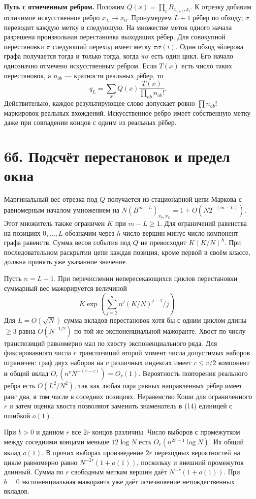 \documentclass[11pt,a4paper]{article}
\newcommand{\sect}[1]{\section*{\sffamily\color{ink}#1}}
\newcommand{\subt}[1]{\par\medskip\noindent\textbf{#1.}\quad}
\begin{document}
\subt{Путь с отмеченным ребром} Положим $Q(x)=\prod_i B_{x_{i+1},x_i}$. К отрезку добавим отличимое искусственное ребро $x_L\to x_0$. Пронумеруем $L+1$ рёбер по обходу; $\sigma$ переводит каждую метку в следующую. На множестве меток одного начала разрешена произвольная перестановка выходящих рёбер. Для совокупной перестановки $\pi$ следующий переход имеет метку $\pi\sigma(i)$. Один обход эйлерова графа получается тогда и только тогда, когда $\pi\sigma$ есть один цикл. Его начало однозначно отмечено искусственным ребром. Если $T(x)$ есть число таких перестановок, а $n_{ab}$ --- кратности реальных рёбер, то
\[
                       q_L=\sum_x Q(x)\frac{T(x)}{\prod_{ab} n_{ab}!}.       \tag{14}
\]
Действительно, каждое результирующее слово допускает ровно $\prod n_{ab}!$ маркировок реальных вхождений. Искусственное ребро имеет собственную метку даже при совпадении концов с одним из реальных рёбер.
\newpage
\sect{6б. Подсчёт перестановок и предел окна}
Маргинальный вес отрезка под $Q$ получается из стационарной цепи Маркова с равномерным началом умножением на $N(B^{m-L})_{x_0,x_L}=1+O(N2^{-(m-L)})$. Этот множитель также ограничен $K$ при $m-L\ge1$. Для ограничений равенства на позициях $0,\ldots,L$ обозначим через $h$ число вершин минус число компонент графа равенств. Сумма весов события под $Q$ не превосходит $K(K/N)^h$. При последовательном раскрытии цепи каждая позиция, кроме первой в своём классе, должна принять уже указанное значение.

Пусть $n=L+1$. При перечислении непересекающихся циклов перестановки суммарный вес мажорируется величиной
\[
 K\exp\!\left(\sum_{j=2}^{n} n^j(K/N)^{j-1}/j\right).
\]
Для $L=O(\sqrt N)$ сумма вкладов перестановок хотя бы с одним циклом длины $\ge3$ равна $O(N^{-1/2})$ по той же экспоненциальной мажоранте. Хвост по числу транспозиций равномерно мал по хвосту экспоненциального ряда. Для фиксированного числа $r$ транспозиций второй момент числа допустимых наборов ограничен: граф двух наборов на $v$ различных индексах имеет $c\le v/2$ компонент и общий вклад $O_r(n^v N^{-(v-c)})=O_r(1)$. Вероятность повторения реального ребра есть $O(L^2/N^2)$, так как любая пара равных направленных рёбер имеет ранг два, в том числе в соседних позициях. Неравенство Коши для ограниченного $r$ и затем оценка хвоста позволяют заменить знаменатель в (14) единицей с ошибкой $o(1)$.

При $b>0$ и данном $r$ все $2r$ концов различны. Число выборов с промежутком между соседними концами меньше $12\log N$ есть $O_r(n^{2r-1}\log N)$. Их общий вклад $o(1)$. В прочих выборах произведение $2r$ переходных вероятностей на цикле равномерно равно $N^{-2r}(1+o(1))$, поскольку и внешний промежуток длинный. Сумма по $r$ свободным меткам вершин даёт $N^{-r}(1+o(1))$. При $b=0$ экспоненциальная мажоранта уже даёт исчезновение нетождественных вкладов.
\end{document}
